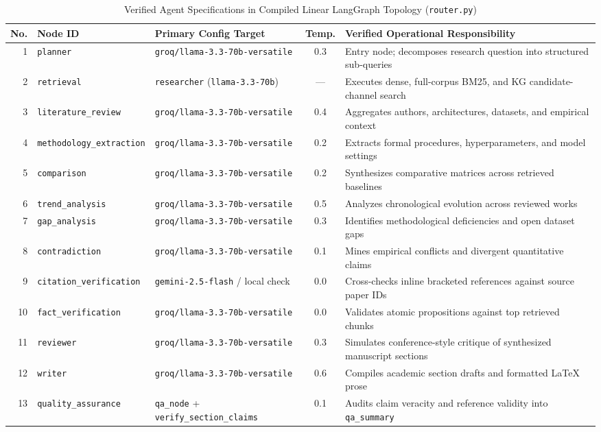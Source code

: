 \documentclass[conference]{IEEEtran}
\begin{document}
\begin{table}[t]
\centering
\caption{Verified Agent Specifications in Compiled Linear LangGraph Topology (\texttt{router.py})}
\label{tab:agents}
\footnotesize
\setlength{\tabcolsep}{4pt}
\begin{tabular}{rllcp{7.2cm}}
\toprule
\textbf{No.} & \textbf{Node ID} & \textbf{Primary Config Target} & \textbf{Temp.} & \textbf{Verified Operational Responsibility} \\
\midrule
1 & \texttt{planner} & \texttt{groq/llama-3.3-70b-versatile} & 0.3 & Entry node; decomposes research question into structured sub-queries \\
2 & \texttt{retrieval} & \texttt{researcher} (\texttt{llama-3.3-70b}) & --- & Executes dense, full-corpus BM25, and KG candidate-channel search \\
3 & \texttt{literature\_review} & \texttt{groq/llama-3.3-70b-versatile} & 0.4 & Aggregates authors, architectures, datasets, and empirical context \\
4 & \texttt{methodology\_extraction} & \texttt{groq/llama-3.3-70b-versatile} & 0.2 & Extracts formal procedures, hyperparameters, and model settings \\
5 & \texttt{comparison} & \texttt{groq/llama-3.3-70b-versatile} & 0.2 & Synthesizes comparative matrices across retrieved baselines \\
6 & \texttt{trend\_analysis} & \texttt{groq/llama-3.3-70b-versatile} & 0.5 & Analyzes chronological evolution across reviewed works \\
7 & \texttt{gap\_analysis} & \texttt{groq/llama-3.3-70b-versatile} & 0.3 & Identifies methodological deficiencies and open dataset gaps \\
8 & \texttt{contradiction} & \texttt{groq/llama-3.3-70b-versatile} & 0.1 & Mines empirical conflicts and divergent quantitative claims \\
9 & \texttt{citation\_verification} & \texttt{gemini-2.5-flash} / local check & 0.0 & Cross-checks inline bracketed references against source paper IDs \\
10 & \texttt{fact\_verification} & \texttt{groq/llama-3.3-70b-versatile} & 0.0 & Validates atomic propositions against top retrieved chunks \\
11 & \texttt{reviewer} & \texttt{groq/llama-3.3-70b-versatile} & 0.3 & Simulates conference-style critique of synthesized manuscript sections \\
12 & \texttt{writer} & \texttt{groq/llama-3.3-70b-versatile} & 0.6 & Compiles academic section drafts and formatted LaTeX prose \\
13 & \texttt{quality\_assurance} & \texttt{qa\_node} + \texttt{verify\_section\_claims} & 0.1 & Audits claim veracity and reference validity into \texttt{qa\_summary} \\
\bottomrule
\end{tabular}
\end{table}
\end{document}
